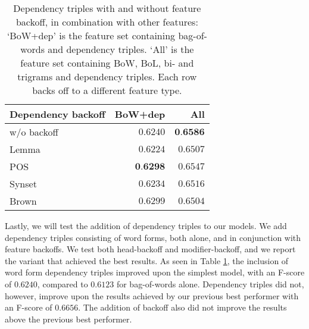 \documentclass[11pt,letterpaper]{article}
\begin{document}
\begin{table}
  \begin{smaller}    
  \begin{center}
    \begin{tabular}{lrr}
      \toprule           
      Dependency backoff & BoW+dep & All\\
      \midrule
      w/o backoff & $0.6240$ & $\textbf{0.6586}$ \\
      Lemma & $0.6224$ & $0.6507$ \\
      POS & $\textbf{0.6298}$ & $0.6547$ \\ %
      Synset & $0.6234$ & $0.6516$  \\ %
      Brown & $0.6299$ & $0.6504$ \\ %
      \bottomrule
    \end{tabular}
  \end{center}
  \caption{Dependency triples with and without feature backoff, in combination with other features: 
`BoW+dep' is the feature set containing bag-of-words and dependency triples. `All' is the feature set containing BoW, BoL, bi- and trigrams and dependency triples. Each row backs off to a different feature type.}
  \label{tab:depbackoff}
  \end{smaller}
\end{table}

Lastly, we will test the addition of dependency triples to our models. We add
dependency triples consisting of word forms, both alone, and in conjunction
with feature backoffs. We test both head-backoff and modifier-backoff, and we report the variant that achieved the best results. As seen in Table
\ref{tab:depbackoff}, the inclusion of word form dependency triples improved
upon the simplest model, with an F-score of $0.6240$, compared to $0.6123$ for
bag-of-words alone. Dependency triples did not, however, improve upon the
results achieved by our previous best performer with an F-score of $0.6656$. %
The addition of backoff also did not improve the results above the previous best performer.
\end{document}
